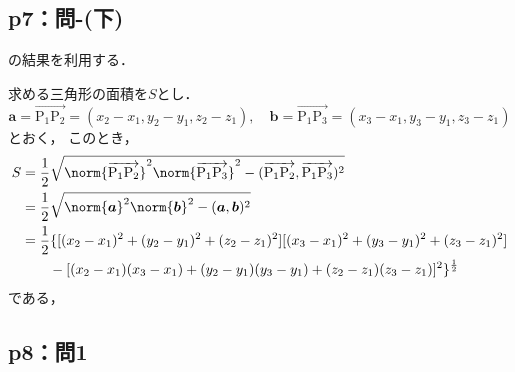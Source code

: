\documentclass[uplatex,dvipdfmx,a4paper,10pt,fleqn]{jsarticle}
\begin{document}
    \subsection*{p7：問-(下)}
\begin{tleftbar}
	[1.4]の結果を利用する．

	求める三角形の面積を$S$とし．
    \[
    \bm{a}=\overrightarrow{\mathrm{P_1 P_2}}=(x_2-x_1,y_2-y_1,z_2-z_1),\quad \bm{b}=\overrightarrow{\mathrm{P_1 P_3}}=(x_3-x_1,y_3-y_1,z_3-z_1)
    \]
    とおく，
	このとき，
	\begin{align*}
		S & = \frac{1}{2} \sqrt{\norm{\overrightarrow{\mathrm{P_1 P_2}}}^2 \norm{\overrightarrow{\mathrm{P_1 P_3}}}^2 - (\overrightarrow{\mathrm{P_1 P_2}}, \overrightarrow{\mathrm{P_1 P_3}})^2} \\
		  & = \frac{1}{2} \sqrt{\norm{\bm{a}}^2 \norm{\bm{b}}^2 - (\bm{a},\bm{b})^2 } \\
		  & = \frac{1}{2} \{ \lbrack (x_2 - x_1)^2+(y_2-y_1)^2+ (z_2 - z_1)^2 \rbrack \lbrack (x_3 - x_1)^2+(y_3-y_1)^2+ (z_3 - z_1)^2 \rbrack\\
		  & \qquad - \lbrack (x_2-x_1)(x_3-x_1)+(y_2 -y_1)(y_3-y_1)+(z_2-z_1)(z_3-z_1)\rbrack ^2\}^{\frac{1}{2}}
	\end{align*}
	である，
\end{tleftbar}
	
\newpage

\subsection*{p8：問1}
\end{document}
